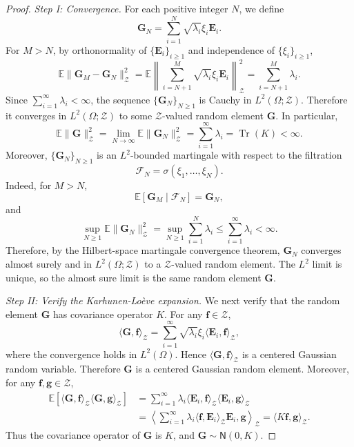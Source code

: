 \documentclass[11pt]{article}
\begin{document}
\begin{proof}
\textit{Step I: Convergence.} For each positive integer $N$, we define
\[
    \mathbf G_N
    =
    \sum_{i=1}^N\sqrt{\lambda_i}\xi_i\mathbf E_i .
\]
For $M>N$, by orthonormality of $\{\mathbf E_i\}_{i\ge 1}$ and independence of
$\{\xi_i\}_{i\ge 1}$,
\[
    \mathbb E\|\mathbf G_M-\mathbf G_N\|_{\mathcal Z}^2
    =
    \mathbb E
    \left\|
        \sum_{i=N+1}^M\sqrt{\lambda_i}\xi_i\mathbf E_i
    \right\|_{\mathcal Z}^2
    =
    \sum_{i=N+1}^M\lambda_i .
\]
Since $\sum_{i=1}^\infty \lambda_i<\infty$, the sequence
$\{\mathbf G_N\}_{N\ge 1}$ is Cauchy in $L^2(\Omega;\mathcal Z)$.
Therefore it converges in $L^2(\Omega;\mathcal Z)$ to some $\mathcal Z$-valued random element $\mathbf G$. In particular,
\[
    \mathbb E\|\mathbf G\|_{\mathcal Z}^2
    =
    \lim_{N\to\infty}\mathbb E\|\mathbf G_N\|_{\mathcal Z}^2
    =
    \sum_{i=1}^\infty \lambda_i
    =
    \operatorname{Tr}(K)
    <\infty.
\]
Moreover, $\{\mathbf G_N\}_{N\ge 1}$ is an $L^2$-bounded martingale with respect to the filtration
\[
    \mathcal F_N=\sigma(\xi_1,\ldots,\xi_N).
\]
Indeed, for $M>N$,
\[
    \mathbb E[\mathbf G_M\mid \mathcal F_N]=\mathbf G_N,
\]
and
\[
    \sup_{N\ge 1}\mathbb E\|\mathbf G_N\|_{\mathcal Z}^2
    =
    \sup_{N\ge 1}\sum_{i=1}^N\lambda_i
    \leq
    \sum_{i=1}^\infty \lambda_i
    <\infty.
\]
Therefore, by the Hilbert-space martingale convergence theorem, $\mathbf G_N$ converges almost surely and in $L^2(\Omega;\mathcal Z)$ to a
$\mathcal Z$-valued random element. The $L^2$ limit is unique, so the almost sure limit is the same random element $\mathbf G$.

\item\textit{Step II: Verify the Karhunen-Loève expansion.} We next verify that the random element $\mathbf G$ has covariance operator $K$. For any $\mathbf f\in\mathcal Z$,
\[
    \langle \mathbf G,\mathbf f\rangle_{\mathcal Z}
    =
    \sum_{i=1}^\infty \sqrt{\lambda_i}\xi_i
    \langle \mathbf E_i,\mathbf f\rangle_{\mathcal Z},
\]
where the convergence holds in $L^2(\Omega)$. Hence
$\langle \mathbf G,\mathbf f\rangle_{\mathcal Z}$ is a centered Gaussian random variable. Therefore $\mathbf G$ is a centered Gaussian random element. Moreover,
for any $\mathbf f,\mathbf g\in\mathcal Z$,
\[
\begin{aligned}
    \mathbb E
    \left[
        \langle \mathbf G,\mathbf f\rangle_{\mathcal Z}
        \langle \mathbf G,\mathbf g\rangle_{\mathcal Z}
    \right]
    &=
    \sum_{i=1}^\infty \lambda_i
    \langle \mathbf E_i,\mathbf f\rangle_{\mathcal Z}
    \langle \mathbf E_i,\mathbf g\rangle_{\mathcal Z}  \\
    &=
    \left\langle
        \sum_{i=1}^\infty \lambda_i
        \langle \mathbf f,\mathbf E_i\rangle_{\mathcal Z}\mathbf E_i,
        \mathbf g
    \right\rangle_{\mathcal Z}=
    \langle K\mathbf f,\mathbf g\rangle_{\mathcal Z}.
\end{aligned}
\]
Thus the covariance operator of $\mathbf G$ is $K$, and $\mathbf G\sim\mathsf N(0,K)$.


\end{proof}
\end{document}
